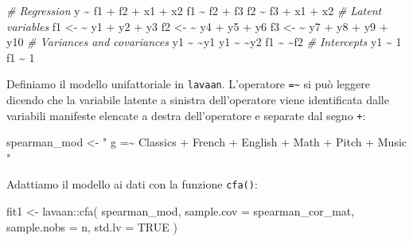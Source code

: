 \documentclass[
  11pt,
]{krantz}
\makeatletter
\newenvironment{Shaded}{\begin{snugshade}}{\end{snugshade}}
\newcommand{\AttributeTok}[1]{\textcolor[rgb]{0.61,0.61,0.61}{#1}}
\newcommand{\CommentTok}[1]{\textcolor[rgb]{0.37,0.37,0.37}{\textit{#1}}}
\newcommand{\ConstantTok}[1]{\textcolor[rgb]{0,0,0}{#1}}
\newcommand{\DecValTok}[1]{\textcolor[rgb]{0.06,0.06,0.06}{#1}}
\newcommand{\ErrorTok}[1]{\textcolor[rgb]{0.14,0.14,0.14}{\textbf{#1}}}
\newcommand{\FunctionTok}[1]{\textcolor[rgb]{0,0,0}{#1}}
\newcommand{\NormalTok}[1]{#1}
\newcommand{\OtherTok}[1]{\textcolor[rgb]{0.37,0.37,0.37}{#1}}
\newcommand{\SpecialCharTok}[1]{\textcolor[rgb]{0,0,0}{#1}}
\newcommand{\StringTok}[1]{\textcolor[rgb]{0.5,0.5,0.5}{#1}}
\newenvironment{kframe}{%
\medskip{}
\setlength{\fboxsep}{.8em}
 \def\at@end@of@kframe{}%
 \ifinner\ifhmode%
  \def\at@end@of@kframe{\end{minipage}}%
  \begin{minipage}{\columnwidth}%
 \fi\fi%
 \def\FrameCommand##1{\hskip\@totalleftmargin \hskip-\fboxsep
 \colorbox{shadecolor}{##1}\hskip-\fboxsep
     \hskip-\linewidth \hskip-\@totalleftmargin \hskip\columnwidth}%
 \MakeFramed {\advance\hsize-\width
   \@totalleftmargin\z@ \linewidth\hsize
   \@setminipage}}%
 {\par\unskip\endMakeFramed%
 \at@end@of@kframe}
\renewenvironment{Shaded}{\begin{kframe}}{\end{kframe}}
\theoremstyle{definition}
\theoremstyle{definition}
\theoremstyle{definition}
\theoremstyle{definition}
\theoremstyle{remark}
\makeatother
\begin{document}
\begin{Shaded}
\begin{Highlighting}[]
\CommentTok{\# Regression}
\NormalTok{y }\SpecialCharTok{\textasciitilde{}}\NormalTok{ f1 }\SpecialCharTok{+}\NormalTok{ f2 }\SpecialCharTok{+}\NormalTok{ x1 }\SpecialCharTok{+}\NormalTok{ x2}
\NormalTok{f1 }\SpecialCharTok{\textasciitilde{}}\NormalTok{ f2 }\SpecialCharTok{+}\NormalTok{ f3}
\NormalTok{f2 }\SpecialCharTok{\textasciitilde{}}\NormalTok{ f3 }\SpecialCharTok{+}\NormalTok{ x1 }\SpecialCharTok{+}\NormalTok{ x2}
\CommentTok{\# Latent variables}
\NormalTok{f1 }\OtherTok{\textless{}{-}} \ErrorTok{\textasciitilde{}}\NormalTok{ y1 }\SpecialCharTok{+}\NormalTok{ y2 }\SpecialCharTok{+}\NormalTok{ y3}
\NormalTok{f2 }\OtherTok{\textless{}{-}} \ErrorTok{\textasciitilde{}}\NormalTok{ y4 }\SpecialCharTok{+}\NormalTok{ y5 }\SpecialCharTok{+}\NormalTok{ y6}
\NormalTok{f3 }\OtherTok{\textless{}{-}} \ErrorTok{\textasciitilde{}}\NormalTok{ y7 }\SpecialCharTok{+}\NormalTok{ y8 }\SpecialCharTok{+}\NormalTok{ y9 }\SpecialCharTok{+}\NormalTok{ y10}
\CommentTok{\# Variances and covariances}
\NormalTok{y1 }\SpecialCharTok{\textasciitilde{}} \ErrorTok{\textasciitilde{}}\NormalTok{y1}
\NormalTok{y1 }\SpecialCharTok{\textasciitilde{}} \ErrorTok{\textasciitilde{}}\NormalTok{y2}
\NormalTok{f1 }\SpecialCharTok{\textasciitilde{}} \ErrorTok{\textasciitilde{}}\NormalTok{f2}
\CommentTok{\# Intercepts}
\NormalTok{y1 }\SpecialCharTok{\textasciitilde{}} \DecValTok{1}
\NormalTok{f1 }\SpecialCharTok{\textasciitilde{}} \DecValTok{1}
\end{Highlighting}
\end{Shaded}

Definiamo il modello unifattoriale in \texttt{lavaan}. L'operatore \texttt{=\textasciitilde{}} si può leggere dicendo che la variabile latente a sinistra dell'operatore viene identificata dalle variabili manifeste elencate a destra dell'operatore e separate dal segno \texttt{+}:

\begin{Shaded}
\begin{Highlighting}[]
\NormalTok{spearman\_mod }\OtherTok{\textless{}{-}} \StringTok{"}
\StringTok{  g =\textasciitilde{} Classics + French + English + Math + Pitch + Music}
\StringTok{"}
\end{Highlighting}
\end{Shaded}

Adattiamo il modello ai dati con la funzione \texttt{cfa()}:

\begin{Shaded}
\begin{Highlighting}[]
\NormalTok{fit1 }\OtherTok{\textless{}{-}}\NormalTok{ lavaan}\SpecialCharTok{::}\FunctionTok{cfa}\NormalTok{(}
\NormalTok{  spearman\_mod,}
  \AttributeTok{sample.cov =}\NormalTok{ spearman\_cor\_mat,}
  \AttributeTok{sample.nobs =}\NormalTok{ n,}
  \AttributeTok{std.lv =} \ConstantTok{TRUE}
\NormalTok{)}
\end{Highlighting}
\end{Shaded}
\end{document}
